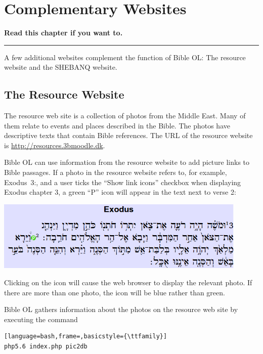 \documentclass[11pt,oneside,a4paper]{memoir}
\newcommand*{\bibleref}[3]{#1~#2\thinspace:\thinspace#3}
\begin{document}
\chapter{Complementary Websites}

\textbf{Read this chapter if you want to.}
\plainbreak{3}


A few additional websites complement the function of Bible OL: The resource website and the SHEBANQ
website.



\section{The Resource Website}\label{sec-resource-web}

The resource web site is a collection of photos from the Middle East. Many of them relate to events
and places described in the Bible. The photos have descriptive texts that contain Bible references.
The URL of the resource website is \url{http://resources.3bmoodle.dk}.

Bible OL can use information from the resource website to add picture links to Bible passages. If a
photo in the resource website refers to, for example, \bibleref{Exodus}{3}{2}, and a user ticks the
``Show link icons'' checkbox when displaying Exodus chapter 3, a green ``P'' icon will appear in the
text next to verse 2:

\begin{center}
\includegraphics[width=0.9\textwidth]{exodus3.png}
\end{center}

Clicking on the icon will cause the web browser to display the relevant photo. If there are more
than one photo, the icon will be blue rather than green.

Bible OL gathers information about the photos on the resource web site by executing the command

\begin{lstlisting}[language=bash,frame=,basicstyle={\ttfamily}]
php5.6 index.php pic2db
\end{lstlisting}
\end{document}
